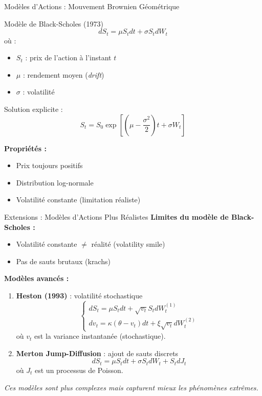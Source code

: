 \documentclass[10pt,aspectratio=169,xcolor={dvipsnames}]{beamer}
\begin{document}
\begin{frame}{Modèles d'Actions : Mouvement Brownien Géométrique}
\begin{block}{Modèle de Black-Scholes (1973)}
\[
dS_t = \mu S_t dt + \sigma S_t dW_t
\]
où :
\begin{itemize}
    \item $S_t$ : prix de l'action à l'instant $t$
    \item $\mu$ : rendement moyen (\textit{drift})
    \item $\sigma$ : volatilité
\end{itemize}

Solution explicite :
\[
S_t = S_0 \exp\left[\left(\mu - \frac{\sigma^2}{2}\right)t + \sigma W_t\right]
\]
\end{block}

\textbf{Propriétés :}
\begin{itemize}
    \item Prix toujours positifs
    \item Distribution log-normale
    \item Volatilité constante (limitation réaliste)
\end{itemize}
\end{frame}

\begin{frame}{Extensions : Modèles d'Actions Plus Réalistes}
\textbf{Limites du modèle de Black-Scholes :}
\begin{itemize}
    \item Volatilité constante $\neq$ réalité (volatility smile)
    \item Pas de sauts brutaux (krachs)
\end{itemize}

\vspace{0.3cm}
\textbf{Modèles avancés :}
\begin{enumerate}
    \item \textbf{Heston (1993)} : volatilité stochastique
    \[
    \begin{cases}
    dS_t = \mu S_t dt + \sqrt{v_t} S_t dW^{(1)}_t \\
    dv_t = \kappa(\theta - v_t)dt + \xi \sqrt{v_t} dW^{(2)}_t
    \end{cases}
    \]
    où $v_t$ est la variance instantanée (stochastique).
    \item \textbf{Merton Jump-Diffusion} : ajout de sauts discrets
    \[
    dS_t = \mu S_t dt + \sigma S_t dW_t + S_t dJ_t
    \]
    où $J_t$ est un processus de Poisson.
\end{enumerate}

\vspace{0.2cm}
\textit{Ces modèles sont plus complexes mais capturent mieux les phénomènes extrêmes.}
\end{frame}
\end{document}
